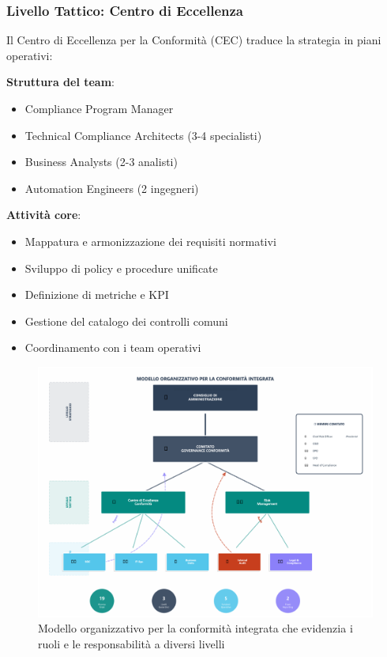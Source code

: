 \subsubsection{Livello Tattico: Centro di Eccellenza}

Il Centro di Eccellenza per la Conformità (CEC) traduce la strategia in piani operativi:

\textbf{Struttura del team}:
\begin{itemize}
    \item Compliance Program Manager
    \item Technical Compliance Architects (3-4 specialisti)
    \item Business Analysts (2-3 analisti)
    \item Automation Engineers (2 ingegneri)
\end{itemize}

\textbf{Attività core}:
\begin{itemize}
    \item Mappatura e armonizzazione dei requisiti normativi
    \item Sviluppo di policy e procedure unificate
    \item Definizione di metriche e KPI
    \item Gestione del catalogo dei controlli comuni
    \item Coordinamento con i team operativi
\end{itemize}

\begin{figure}[h]
\centering


\includegraphics[width=1\textwidth]{thesis_figures/cap4/organigramma_moderno.pdf
}
\caption{Modello organizzativo per la conformità integrata che evidenzia i ruoli e le responsabilità a diversi livelli}
\label{fig:org_structure}
\end{figure}

